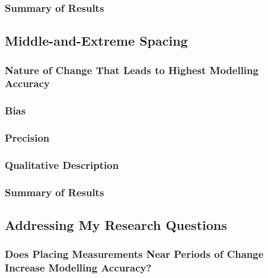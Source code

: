 \documentclass[
12pt, %
twoside,
english]{guelphthesis}
\begin{document}
\hypertarget{summary-of-results-2}{%
\subsubsection{Summary of Results}\label{summary-of-results-2}}

\hypertarget{middle-and-extreme-spacing}{%
\subsection{Middle-and-Extreme Spacing}\label{middle-and-extreme-spacing}}

\hypertarget{nature-change-mid-ext-exp1}{%
\subsubsection{Nature of Change That Leads to Highest Modelling Accuracy}\label{nature-change-mid-ext-exp1}}

\hypertarget{bias-mid-ext-exp1}{%
\subsubsection{Bias}\label{bias-mid-ext-exp1}}

\hypertarget{precision-mid-ext-exp1}{%
\subsubsection{Precision}\label{precision-mid-ext-exp1}}

\hypertarget{qualitative-mid-ext-exp1}{%
\subsubsection{Qualitative Description}\label{qualitative-mid-ext-exp1}}

\hypertarget{summary-of-results-3}{%
\subsubsection{Summary of Results}\label{summary-of-results-3}}

\hypertarget{addressing-my-research-questions}{%
\subsection{Addressing My Research Questions}\label{addressing-my-research-questions}}

\hypertarget{meas-placing}{%
\subsubsection{Does Placing Measurements Near Periods of Change Increase Modelling Accuracy?}\label{meas-placing}}
\end{document}
